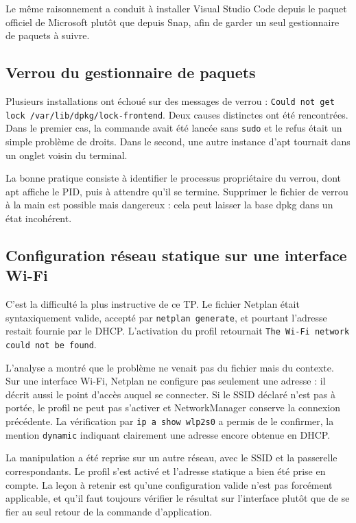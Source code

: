 \documentclass[11pt,a4paper]{article}
\begin{document}
Le m\^eme raisonnement a conduit \`a installer Visual Studio Code depuis le paquet officiel de Microsoft
plut\^ot que depuis Snap, afin de garder un seul gestionnaire de paquets \`a suivre.

\subsection{Verrou du gestionnaire de paquets}

Plusieurs installations ont \'echou\'e sur des messages de verrou :
\texttt{Could not get lock /var/lib/dpkg/lock-frontend}. Deux causes distinctes ont \'et\'e rencontr\'ees.
Dans le premier cas, la commande avait \'et\'e lanc\'ee sans \texttt{sudo} et le refus \'etait un simple
probl\`eme de droits. Dans le second, une autre instance d'apt tournait dans un onglet voisin du terminal.

La bonne pratique consiste \`a identifier le processus propri\'etaire du verrou, dont apt affiche le PID,
puis \`a attendre qu'il se termine. Supprimer le fichier de verrou \`a la main est possible mais dangereux :
cela peut laisser la base dpkg dans un \'etat incoh\'erent.

\subsection{Configuration r\'eseau statique sur une interface Wi-Fi}

C'est la difficult\'e la plus instructive de ce TP. Le fichier Netplan \'etait syntaxiquement valide, accept\'e
par \texttt{netplan generate}, et pourtant l'adresse restait fournie par le DHCP. L'activation du profil
retournait \texttt{The Wi-Fi network could not be found}.

L'analyse a montr\'e que le probl\`eme ne venait pas du fichier mais du contexte. Sur une interface Wi-Fi,
Netplan ne configure pas seulement une adresse : il d\'ecrit aussi le point d'acc\`es auquel se connecter.
Si le SSID d\'eclar\'e n'est pas \`a port\'ee, le profil ne peut pas s'activer et NetworkManager conserve la
connexion pr\'ec\'edente. La v\'erification par \texttt{ip a show wlp2s0} a permis de le confirmer, la mention
\texttt{dynamic} indiquant clairement une adresse encore obtenue en DHCP.

La manipulation a \'et\'e reprise sur un autre r\'eseau, avec le SSID et la passerelle correspondants. Le
profil s'est activ\'e et l'adresse statique a bien \'et\'e prise en compte. La le\c{c}on \`a retenir est
qu'une configuration valide n'est pas forc\'ement applicable, et qu'il faut toujours v\'erifier le r\'esultat
sur l'interface plut\^ot que de se fier au seul retour de la commande d'application.
\end{document}
